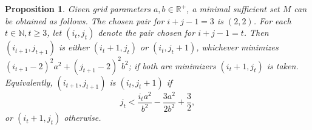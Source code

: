 \documentclass[12pt, a4paper]{article}
\newcommand{\tiles}{t} %
\newcommand{\mss}{M}
\newtheorem{proposition}{Proposition}%
\begin{document}
\begin{proposition}
\label{prop: min suff set}
Given grid parameters $a, b \in \mathbb R^+$, a minimal sufficient set $\mss$ can be obtained as follows. The chosen pair for $i+j-1=3$ is $(2,2)$. For each $\tiles \in \mathbb N, \tiles \geq 3$, let $(i_\tiles, j_\tiles)$ denote the pair chosen for $i+j-1=\tiles$. Then $(i_{\tiles+1}, j_{\tiles+1})$ is either $(i_\tiles+1, j_\tiles)$ or $(i_\tiles, j_\tiles+1)$, whichever minimizes $(i_{\tiles+1}-2)^2 a^2 + (j_{\tiles+1}-2)^2 b^2$; if both are minimizers $(i_\tiles+1, j_\tiles)$ is taken. Equivalently, $(i_{\tiles+1}, j_{\tiles+1})$ is $(i_\tiles, j_\tiles+1)$ if
\begin{equation}
\label{eq: cond for incrementing j}
j_\tiles < \frac{i_\tiles a^2}{b^2} - \frac{3a^2}{2b^2} + \frac 3 2,
\end{equation}
or $(i_\tiles+1, j_\tiles)$ otherwise.
\end{proposition}
\end{document}
